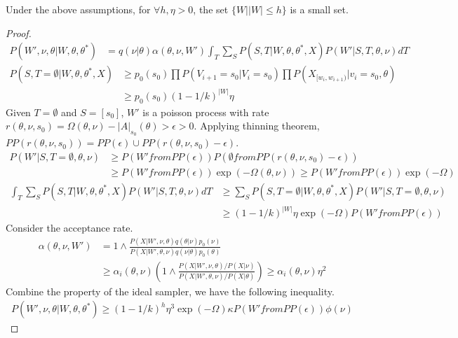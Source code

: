 \begin{theorem}
Under the above assumptions, for $\forall h, \eta > 0$, the set $\{ W | |W| \leq h\}$ is a small set.
\end{theorem}
\begin{proof}
\begin{align*}
P(W', \nu, \theta | W, \theta, \theta^*) &= q(\nu | \theta)\alpha(\theta, \nu, W') \int_T \sum_S P(S,T | W, \theta, \theta^*, X) P(W'| S, T, \theta, \nu)dT  
\end{align*}
\begin{align*}
P(S, T = \emptyset | W, \theta, \theta^*, X) & \geq p_0(s_0)\prod P(V_{i + 1} = s_0 | V_i = s_0) \prod P(X_{[w_i, w_{i + 1})} | v_i = s_0, \theta)\\
& \geq p_0(s_0)(1 - 1/k)^{|W|}\eta
\end{align*}
Given $T = \emptyset$ and $S = [s_0]$, $W'$ is a poisson process with rate $r(\theta, \nu, s_0) = \Omega(\theta, \nu) - |A|_{s_0}(\theta) > \epsilon > 0$. Applying thinning theorem, $PP(r(\theta, \nu, s_0)) = PP(\epsilon) \cup PP(r(\theta, \nu, s_0) - \epsilon)$.
\begin{align*}
P(W' | S, T = \emptyset, \theta, \nu) & \geq P(W' from PP(\epsilon)) P(\emptyset from PP(r(\theta, \nu, s_0) - \epsilon))\\
& \geq P(W' from PP(\epsilon)) \exp(-\Omega(\theta, \nu)) \geq P(W' from PP(\epsilon)) \exp(-\Omega)
\end{align*}
\begin{align*}
\int_T \sum_S P(S,T | W, \theta, \theta^*, X) P(W'| S, T, \theta, \nu)dT &\geq \sum_S P(S, T = \emptyset | W, \theta, \theta^*, X) P(W' | S, T=\emptyset,\theta, \nu)\\
& \geq (1 - 1/k)^{|W|}\eta \exp(-\Omega) P(W' from PP(\epsilon))
\end{align*}
Consider the acceptance rate.
\begin{align*}
\alpha(\theta, \nu, W') &= 1 \wedge \frac{P(X | W', \nu, \theta) q(\theta|\nu)p_0(\nu)}{P(X | W', \theta, \nu)q(\nu|\theta)p_0(\theta)}\\
& \geq \alpha_i(\theta, \nu)(1 \wedge \frac{P(X|W', \nu, \theta) / P(X|\nu)}{P(X|W', \theta, \nu) / P(X|\theta)}) \geq \alpha_i(\theta, \nu)\eta^2
\end{align*}
Combine the property of the ideal sampler, we have the following inequality.
\begin{align*}
P(W', \nu, \theta | W, \theta, \theta^*) \geq (1 - 1/k)^{h} \eta^3 \exp(-\Omega)\kappa P(W' from PP(\epsilon))\phi(\nu)
\end{align*}
\end{proof}

